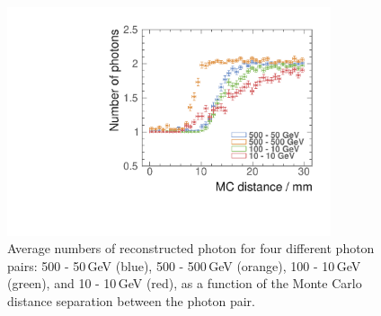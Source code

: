 \begin{figure}[tbph]
\centering
        \includegraphics[width=0.85\textwidth]{photon/DoubleCompareEnergies.pdf}
        \caption{Average numbers of reconstructed photon for four different photon pairs: 500 - 50\,GeV (blue), 500 - 500\,GeV (orange), 100 - 10\,GeV (green), and 10 - 10\,GeV (red), as a function of the Monte Carlo distance separation between the photon pair.}
        \label{fig:photonDoubleCompareEnergies}
\end{figure}

